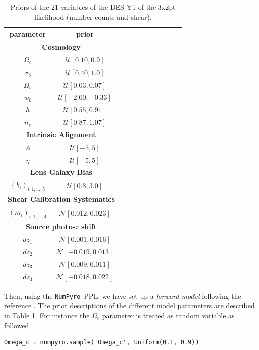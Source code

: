 \documentclass[twocolumn,twocolappendix,nofootinbib,iop]{openjournal}
\newcommand{\numpyro}{\texttt{NumPyro}}
\begin{document}
\begin{table}[htb]
\caption{Priors of the 21 variables of the DES-Y1 of the 3x2pt likelihood (number counts and shear).}
\label{tab-DESY1}
 \centering
\begin{tabular}{ccccccccccc}
\hline
 parameter &  prior \\
 \hline
  \multicolumn{2}{c}{\textbf{Cosmology}} \\
$\Omega_c$ & $\mathcal{U}[0.10, 0.9]$ \\ %
$\sigma_8$ & $\mathcal{U}[0.40, 1.0]$ \\
$\Omega_b$ & $\mathcal{U}[0.03, 0.07]$ \\
$w_0$ & $\mathcal{U}[-2.00, -0.33]$ \\
$h$ & $\mathcal{U}[0.55, 0.91]$ \\
$n_s$ & $\mathcal{U}[0.87, 1.07]$ \\
\multicolumn{2}{c}{\textbf{Intrinsic Alignment}} \\
$A$ & $\mathcal{U}[-5,5]$ \\
$\eta$ &$\mathcal{U}[-5,5]$ \\
\multicolumn{2}{c}{\textbf{Lens Galaxy Bias}} \\
$(b_i)_{i:1,\dots,5}$ & $\mathcal{U}[0.8,3.0]$ \\
\multicolumn{2}{c}{\textbf{Shear Calibration Systematics}} \\
$(m_i)_{i:1,\dots,4}$ & $\mathcal{N}[0.012,0.023]$ \\
\multicolumn{2}{c}{\textbf{Source photo-$z$ shift}} \\
$dz_1$ & $\mathcal{N}[0.001,0.016]$ \\ %
$dz_2$ & $\mathcal{N}[-0.019,0.013]$ \\
$dz_3$ & $\mathcal{N}[0.009,0.011]$ \\
$dz_4$ & $\mathcal{N}[-0.018,0.022]$ \\
\hline
\end{tabular}
\end{table}


Then, using the \numpyro\ PPL, we have set up a \textit{forward model} following the reference \citep{2018PhRvD..98d3526A}. The prior descriptions of the different model parameters are described in Table \ref{tab-DESY1}.  For instance the $\Omega_c$ parameter is treated as random variable as followed
\begin{lstlisting}[language=iPython]
Omega_c = numpyro.sample('Omega_c', Uniform(0.1, 0.9))
\end{lstlisting}
\end{document}
